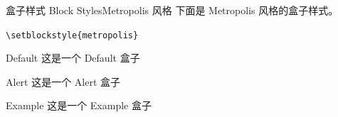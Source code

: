 \documentclass[10pt,aspectratio=169,fontset=none]{ctexbeamer}
\begin{document}
    \begin{frame}{盒子样式 Block Styles}{Metropolis 风格}
    下面是 Metropolis 风格的盒子样式。    

        \begin{center}
            \texttt{\textcolor{primary}{\textbackslash setblockstyle}\{metropolis\}}
        \end{center}

        \centering
        \begin{minipage}[b]{0.28\textwidth}
            \begin{block}{Default}
                这是一个 Default 盒子
            \end{block}    
        \end{minipage}
        \hspace*{1em}
        \begin{minipage}[b]{0.28\textwidth}
            \begin{alertblock}{Alert}
                这是一个 Alert 盒子
            \end{alertblock}      
        \end{minipage}
        \hspace*{1em}
        \begin{minipage}[b]{0.28\textwidth}
            \begin{exampleblock}{Example}
                这是一个 Example 盒子
            \end{exampleblock}       
        \end{minipage}

    \end{frame}
\end{document}
